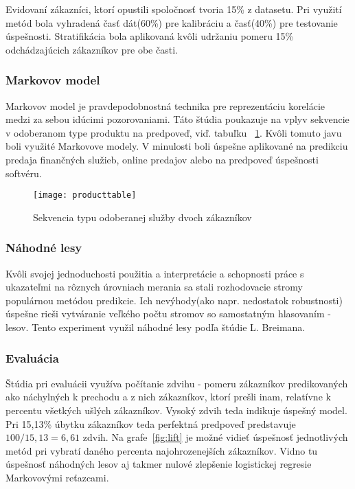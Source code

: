 Evidovaní zákazníci, ktorí opustili spoločnosť tvoria 15\% z datasetu. Pri využití metód bola vyhradená časť dát(60\%) pre kalibráciu a časť(40\%) pre testovanie úspešnosti. Stratifikácia bola aplikovaná kvôli udržaniu pomeru 15\% odchádzajúcich zákazníkov pre obe časti. %

\subsubsection{Markovov model}
\label{markov_markov}

Markovov model je pravdepodobnostná technika pre reprezentáciu korelácie medzi za sebou idúcimi pozorovaniami. Táto štúdia poukazuje na vplyv sekvencie v odoberanom type produktu na predpoveď, viď. tabuľku ~\ref{fig:producttable}. Kvôli tomuto javu boli využité Markovove modely. V minulosti boli úspešne aplikované na predikciu predaja finančných služieb, online predajov alebo na predpoveď úspešnosti softvéru.
\begin{figure}[H]
\begin{center}
\texttt{[image: producttable]}\end{center}
\caption[producttable]{Sekvencia typu odoberanej služby dvoch zákazníkov}\label{fig:producttable}
\end{figure}

\subsubsection{Náhodné lesy}
\label{markov_lesy}

Kvôli svojej jednoduchosti použitia a interpretácie a schopnosti práce s ukazateľmi na rôznych úrovniach merania sa stali rozhodovacie stromy populárnou metódou predikcie. Ich nevýhody(ako napr. nedostatok robustnosti) úspešne rieši vytváranie veľkého počtu stromov so samostatným hlasovaním - lesov. Tento experiment využil náhodné lesy podľa štúdie L. Breimana. %

\subsubsection{Evaluácia}
\label{markov_evaluacia}

Štúdia pri evaluácii využíva počítanie zdvihu - pomeru zákazníkov predikovaných ako náchylných k prechodu a z nich zákazníkov, ktorí prešli inam, relatívne k percentu všetkých ušlých zákazníkov. Vysoký zdvih teda indikuje úspešný model. Pri 15,13\% úbytku zákazníkov teda perfektná predpoveď predstavuje $100/15,13 = 6,61$ zdvih. Na grafe~\ref{fig:lift} je možné vidieť úspešnosť jednotlivých metód pri vybratí daného percenta najohrozenejších zákazníkov. Vidno tu úspešnosť náhodných lesov aj takmer nulové zlepšenie logistickej regresie Markovovými reťazcami.

